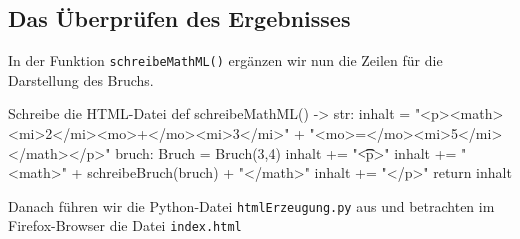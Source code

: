 \subsection{Das Überprüfen des Ergebnisses}

In der Funktion \texttt{schreibeMathML()} ergänzen wir nun die Zeilen für die Darstellung des Bruchs.

\begin{codePython}{Schreibe die HTML-Datei}
def schreibeMathML() -> str:
	inhalt = "<p><math><mi>2</mi><mo>+</mo><mi>3</mi>"
				+ "<mo>=</mo><mi>5</mi></math></p>"
	bruch: Bruch = Bruch(3,4)
	inhalt += "\n\t\t<p>"
	inhalt += "<math>" + schreibeBruch(bruch) + "</math>"
	inhalt += "</p>"
	return inhalt
\end{codePython}

Danach führen wir die Python-Datei \texttt{htmlErzeugung.py} aus und betrachten im Firefox-Browser die Datei \texttt{index.html}
